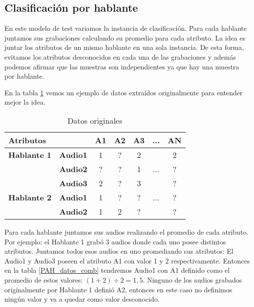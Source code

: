 \subsection{Clasificación por hablante}
\label{prom_los_atributos_de_cada_hablante}

En este modelo de test variamos la instancia de clasificación. Para cada hablante juntamos sus grabaciones calculando su promedio para cada atributo. La idea es juntar los atributos de un mismo hablante en una sola instancia. De esta forma, evitamos los atributos desconocidos en cada una de las grabaciones y además podemos afirmar que las muestras son independientes ya que hay una muestra por hablante.

En la tabla \ref{datos_orig} vemos un ejemplo de datos extraídos originalmente para entender mejor la idea. 

\begin{table}[H]
	\centering
	\begin{tabular}{|l|l|ccccc|}
		\hline
		\multicolumn{2}{|l|}{Atributos} & A1 & A2 & A3 & ... & AN \\
		\hline 
		\textbf{Hablante 1} & \textbf{Audio1} & 1 & ? & 2 & & 2\\
		& \textbf{Audio2} & ? & ? & 1 & ... & ? \\
		& \textbf{Audio3} & 2 & ? & 3 & & ? \\
		\hline
		\textbf{Hablante 2} & \textbf{Audio1} & 1 & ? & ? & ... & ? \\
		& \textbf{Audio2} & 1 & 2 & ? & & ? \\
		\hline
	\end{tabular}
	\caption{Datos originales}
	\label{datos_orig}
\end{table}

Para cada hablante juntamos sus audios realizando el promedio de cada atributo. Por ejemplo: el Hablante 1 grabó 3 audios donde cada uno posee distintos atributos. Juntamos todos esos audios en uno promediando sus atributos: El Audio1 y Audio3 poseen el atributo A1 con valor 1 y 2 respectivamente. Entonces en la tabla \ref{PAH_datos_comb} tendremos Audio1 con A1 definido como el promedio de estos valores: $(1 + 2) \div 2 = 1,5$. Ninguno de los audios grabados originalmente por Hablante 1 definió A2, entonces en este caso no definimos ningún valor y va a quedar como valor desconocido. 

